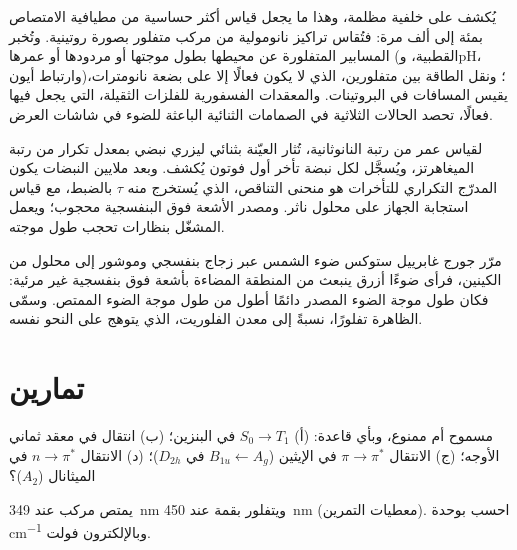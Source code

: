 يُكشف  على خلفية مظلمة، وهذا ما يجعل قياس 
أكثر حساسية من مطيافية الامتصاص بمئة إلى ألف مرة:
فتُقاس تراكيز نانومولية من مركب متفلور بصورة روتينية.
وتُخبر المسابير المتفلورة عن محيطها بطول موجتها أو
مردودها أو عمرها (القطبية، وpH، وارتباط أيون)؛ ونقل الطاقة
بين متفلورين، الذي لا يكون فعالًا إلا على بضعة نانومترات، يقيس
المسافات في البروتينات. والمعقدات الفسفورية للفلزات الثقيلة، التي
يجعل فيها   فعالًا، تحصد الحالات الثلاثية
في الصمامات الثنائية الباعثة للضوء في شاشات العرض.

\begin{inthelab}
لقياس عمر من رتبة النانوثانية، تُثار العيّنة بثنائي ليزري نبضي
بمعدل تكرار من رتبة الميغاهرتز، ويُسجَّل لكل نبضة تأخر
أول فوتون  يُكشف. وبعد ملايين النبضات يكون
المدرّج التكراري للتأخرات هو منحنى التناقص، الذي يُستخرج منه $\tau$ بالضبط، مع
قياس استجابة الجهاز على محلول ناثر. ومصدر الأشعة فوق البنفسجية
محجوب؛ ويعمل المشغّل بنظارات تحجب طول
موجته.
\end{inthelab}

\begin{history}[ستوكس، 1852]
مرّر جورج غابرييل ستوكس ضوء الشمس عبر زجاج بنفسجي وموشور
إلى محلول من الكينين، فرأى ضوءًا أزرق ينبعث من المنطقة المضاءة
بأشعة فوق بنفسجية غير مرئية: فكان طول موجة الضوء المصدر دائمًا أطول
من طول موجة الضوء الممتص. وسمّى الظاهرة تفلورًا، نسبةً إلى
معدن الفلوريت، الذي يتوهج على النحو نفسه.
\end{history}

\section{تمارين}

\begin{exercise}[$\star$]\label{exo:b3:electronic-spectroscopy:1}
مسموح أم ممنوع، وبأي قاعدة: (أ) $S_0 \to T_1$ في البنزين؛ (ب) انتقال 
في معقد ثماني الأوجه؛ (ج) الانتقال $\pi\to\pi^*$ في الإيثين
($B_{1u} \leftarrow A_g$ في $D_{2h}$)؛ (د) الانتقال $n\to\pi^*$ في الميثانال
($A_2$)؟
\end{exercise}

\begin{exercise}[$\star$]\label{exo:b3:electronic-spectroscopy:2}
يمتص مركب عند \qty{349}{nm} ويتفلور بقمة عند
\qty{450}{nm} (معطيات التمرين). احسب  بوحدة \unit{cm^{-1}} 
وبالإلكترون فولت.
\end{exercise}

